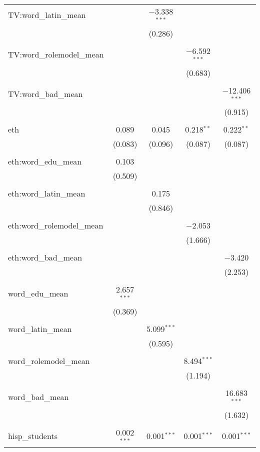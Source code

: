\begin{table}[!htbp]
\begin{tabular}{@{\extracolsep{-2pt}}lcccc}
 TV:word\_latin\_mean &  & $-$3.338$^{***}$ &  &  \\ 
  &  & (0.286) &  &  \\ 
  & & & & \\ 
 TV:word\_rolemodel\_mean &  &  & $-$6.592$^{***}$ &  \\ 
  &  &  & (0.683) &  \\ 
  & & & & \\ 
 TV:word\_bad\_mean &  &  &  & $-$12.406$^{***}$ \\ 
  &  &  &  & (0.915) \\ 
  & & & & \\ 
 eth & 0.089 & 0.045 & 0.218$^{**}$ & 0.222$^{**}$ \\ 
  & (0.083) & (0.096) & (0.087) & (0.087) \\ 
  & & & & \\ 
 eth:word\_edu\_mean & 0.103 &  &  &  \\ 
  & (0.509) &  &  &  \\ 
  & & & & \\ 
 eth:word\_latin\_mean &  & 0.175 &  &  \\ 
  &  & (0.846) &  &  \\ 
  & & & & \\ 
 eth:word\_rolemodel\_mean &  &  & $-$2.053 &  \\ 
  &  &  & (1.666) &  \\ 
  & & & & \\ 
 eth:word\_bad\_mean &  &  &  & $-$3.420 \\ 
  &  &  &  & (2.253) \\ 
  & & & & \\ 
 word\_edu\_mean & 2.657$^{***}$ &  &  &  \\ 
  & (0.369) &  &  &  \\ 
  & & & & \\ 
 word\_latin\_mean &  & 5.099$^{***}$ &  &  \\ 
  &  & (0.595) &  &  \\ 
  & & & & \\ 
 word\_rolemodel\_mean &  &  & 8.494$^{***}$ &  \\ 
  &  &  & (1.194) &  \\ 
  & & & & \\ 
 word\_bad\_mean &  &  &  & 16.683$^{***}$ \\ 
  &  &  &  & (1.632) \\ 
  & & & & \\ 
 hisp\_students & 0.002$^{***}$ & 0.001$^{***}$ & 0.001$^{***}$ & 0.001$^{***}$ \\ 

\end{tabular}
\end{table}
